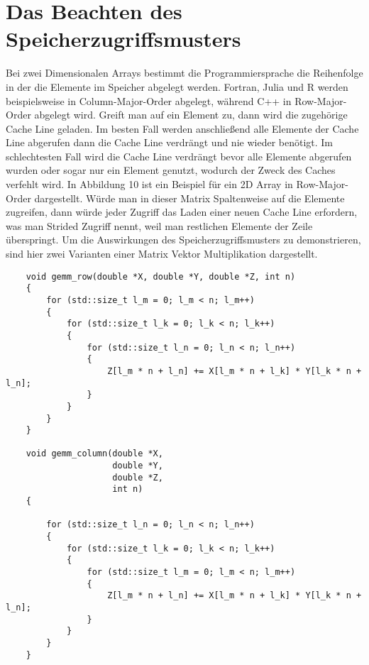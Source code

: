 \documentclass[sigconf,language=english]{acmart}
\begin{document}
\section{Das Beachten des Speicherzugriffsmusters}
    Bei zwei Dimensionalen Arrays bestimmt die Programmiersprache die Reihenfolge 
    in der die Elemente im Speicher abgelegt werden. Fortran, Julia und R werden beispielsweise
    in Column-Major-Order abgelegt, während C++ in Row-Major-Order abgelegt wird.
    Greift man auf ein Element zu, dann wird die zugehörige Cache Line geladen.
    Im besten Fall werden anschließend alle Elemente der Cache Line abgerufen dann die Cache Line verdrängt 
    und nie wieder benötigt. Im schlechtesten Fall wird die Cache Line verdrängt bevor alle Elemente abgerufen wurden 
    oder sogar nur ein Element genutzt, wodurch der Zweck des Caches verfehlt wird.
    In Abbildung 10 ist ein Beispiel für ein 2D Array in Row-Major-Order dargestellt. %
    Würde man in dieser Matrix Spaltenweise auf die Elemente zugreifen,
    dann würde jeder Zugriff das Laden einer neuen Cache Line erfordern, was man Strided Zugriff nennt, 
    weil man restlichen Elemente der Zeile überspringt.
    Um die Auswirkungen des Speicherzugriffsmusters zu demonstrieren, sind hier zwei 
    Varianten einer Matrix Vektor Multiplikation dargestellt.

    \begin{verbatim}
    void gemm_row(double *X, double *Y, double *Z, int n)
    {
        for (std::size_t l_m = 0; l_m < n; l_m++)
        {
            for (std::size_t l_k = 0; l_k < n; l_k++)
            {
                for (std::size_t l_n = 0; l_n < n; l_n++)
                {
                    Z[l_m * n + l_n] += X[l_m * n + l_k] * Y[l_k * n + l_n];
                }
            }
        }
    }
    
    void gemm_column(double *X,
                     double *Y,
                     double *Z,
                     int n)
    {
    
        for (std::size_t l_n = 0; l_n < n; l_n++)
        {
            for (std::size_t l_k = 0; l_k < n; l_k++)
            {
                for (std::size_t l_m = 0; l_m < n; l_m++)
                {
                    Z[l_m * n + l_n] += X[l_m * n + l_k] * Y[l_k * n + l_n];
                }
            }
        }
    }
    \end{verbatim}
\end{document}
